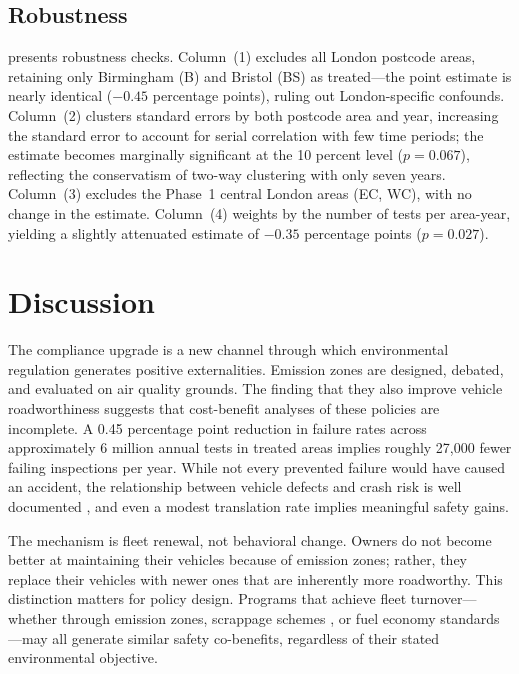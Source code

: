 \documentclass[12pt]{article}
\begin{document}
\subsection{Robustness}



 presents robustness checks. Column~(1) excludes all London postcode areas, retaining only Birmingham (B) and Bristol (BS) as treated---the point estimate is nearly identical ($-0.45$ percentage points), ruling out London-specific confounds. Column~(2) clusters standard errors by both postcode area and year, increasing the standard error to account for serial correlation with few time periods; the estimate becomes marginally significant at the 10 percent level ($p = 0.067$), reflecting the conservatism of two-way clustering with only seven years. Column~(3) excludes the Phase~1 central London areas (EC, WC), with no change in the estimate. Column~(4) weights by the number of tests per area-year, yielding a slightly attenuated estimate of $-0.35$ percentage points ($p = 0.027$).


\section{Discussion}

The compliance upgrade is a new channel through which environmental regulation generates positive externalities. Emission zones are designed, debated, and evaluated on air quality grounds. The finding that they also improve vehicle roadworthiness suggests that cost-benefit analyses of these policies are incomplete. A 0.45 percentage point reduction in failure rates across approximately 6 million annual tests in treated areas implies roughly 27,000 fewer failing inspections per year. While not every prevented failure would have caused an accident, the relationship between vehicle defects and crash risk is well documented \citep{hollingsworth2022}, and even a modest translation rate implies meaningful safety gains.

The mechanism is fleet renewal, not behavioral change. Owners do not become better at maintaining their vehicles because of emission zones; rather, they replace their vehicles with newer ones that are inherently more roadworthy. This distinction matters for policy design. Programs that achieve fleet turnover---whether through emission zones, scrappage schemes \citep{rivers2020}, or fuel economy standards \citep{knittel2011}---may all generate similar safety co-benefits, regardless of their stated environmental objective.
\end{document}
